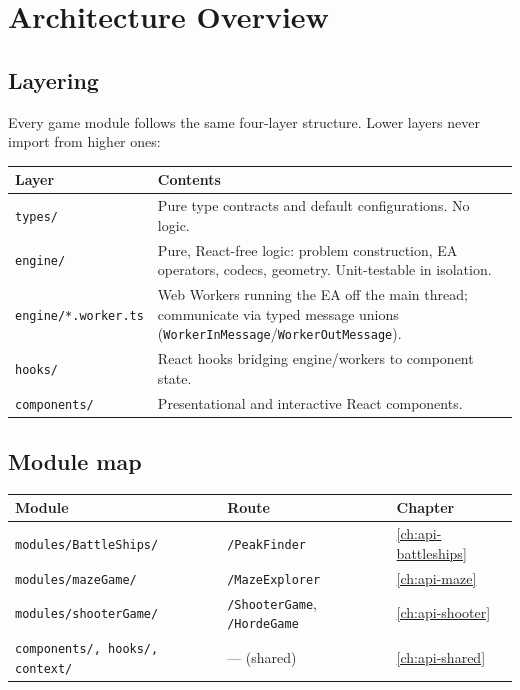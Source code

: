 \documentclass[11pt,a4paper]{report}
\newcommand{\srcfile}[1]{\texttt{\small #1}}   %
\newcommand{\ts}[1]{\texttt{#1}}               %
\begin{document}
\chapter{Architecture Overview}

\section{Layering}

Every game module follows the same four-layer structure. Lower layers never
import from higher ones:

\begin{center}
\begin{tabularx}{\textwidth}{l X}
  \toprule
  \textbf{Layer} & \textbf{Contents} \\
  \midrule
  \ts{types/}      & Pure type contracts and default configurations. No logic. \\
  \ts{engine/}     & Pure, React-free logic: problem construction, EA
                     operators, codecs, geometry. Unit-testable in isolation. \\
  \ts{engine/*.worker.ts} & Web Workers running the EA off the main thread;
                     communicate via typed message unions
                     (\ts{WorkerInMessage}/\ts{WorkerOutMessage}). \\
  \ts{hooks/}      & React hooks bridging engine/workers to component state. \\
  \ts{components/} & Presentational and interactive React components. \\
  \bottomrule
\end{tabularx}
\end{center}

\section{Module map}

\begin{center}
\begin{tabularx}{\textwidth}{l l X}
  \toprule
  \textbf{Module} & \textbf{Route} & \textbf{Chapter} \\
  \midrule
  \srcfile{modules/BattleShips/}  & \ts{/PeakFinder}   & \ref{ch:api-battleships} \\
  \srcfile{modules/mazeGame/}     & \ts{/MazeExplorer} & \ref{ch:api-maze} \\
  \srcfile{modules/shooterGame/}  & \ts{/ShooterGame}, \ts{/HordeGame} & \ref{ch:api-shooter} \\
  \srcfile{components/, hooks/, context/} & --- (shared) & \ref{ch:api-shared} \\
  \bottomrule
\end{tabularx}
\end{center}
\end{document}
